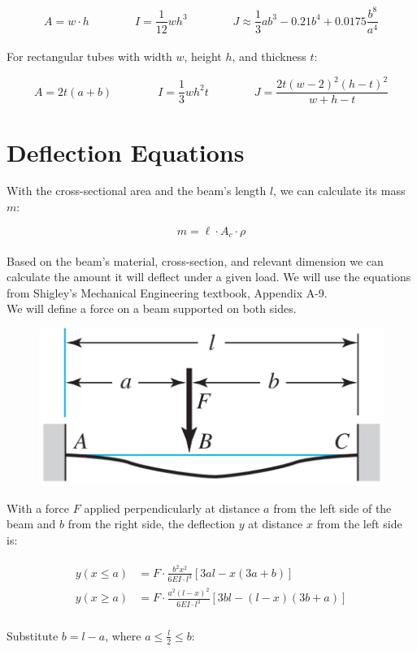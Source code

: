 \documentclass[a4paper]{article}
\begin{document}
	\begin{equation}
		A = w \cdot h \qquad\qquad
		I = \frac{1}{12} w h^3 \qquad\qquad
		J \approx \frac{1}{3} a b^3 - 0.21 b^4 + 0.0175 \frac{b^8}{a^4}
	\end{equation}
	\\
	For rectangular tubes with width $ w $, height $ h $, and thickness $ t $:
	
	\begin{equation}
		A = 2t(a+b) \qquad\qquad
		I = \frac{1}{3} w h^2 t \qquad\qquad
		J = \frac{2t (w-2)^2 (h-t)^2}{w + h - t}
	\end{equation}
	
	
	\section*{Deflection Equations}
	
	With the cross-sectional area and the beam's length $ l $, we can calculate its mass $ m $:
	
	\begin{equation}
		m = \ell \cdot A_c \cdot \rho
	\end{equation}
	\\
	Based on the beam's material, cross-section, and relevant dimension we can calculate the amount it will deflect under a given load. We will use the equations from Shigley's Mechanical Engineering textbook, Appendix A-9.\\
	
	\newpage
	We will define a force on a beam supported on both sides.
	
	\begin{figure}[H]
		\centering
		\includegraphics[width=0.7\linewidth]{../img/docs_beambend_btwn}
	\end{figure}
	
	With a force $ F $ applied perpendicularly at distance $ a $ from the left side of the beam and $ b $ from the right side, the deflection $ y $ at distance $ x $ from the left side is:
	
	\begin{gather}
	\begin{aligned}
		y\left( x \leq a \right) &= F \cdot \frac{b^2 x^2}{6 EI \cdot l^3} \left[ 3a l - x \left( 3a+b \right) \right] \\
		y\left( x \geq a \right) &= F \cdot \frac{a^2 \left( l - x \right)^2}{6 EI \cdot l^3} \left[ 3b l - \left( l - x \right) \left( 3b+a \right) \right]
	\end{aligned}
	\end{gather}
	\\
	Substitute $ b = l - a $, where $ a \leq \frac{l}{2} \leq b $:
	
\end{document}
